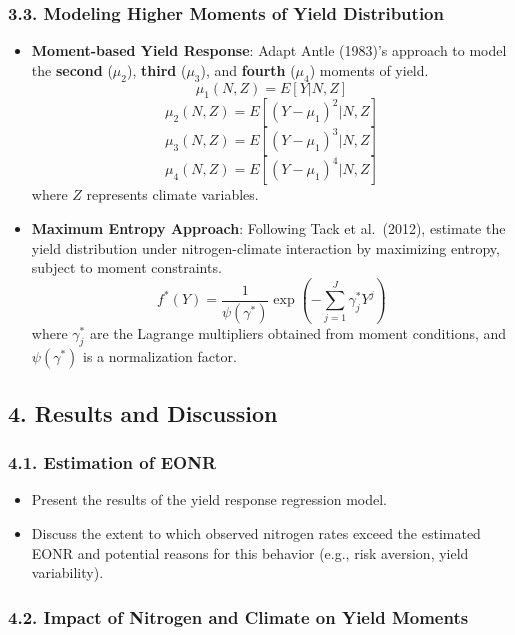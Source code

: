 \documentclass[
]{article}
\providecommand{\tightlist}{%
  \setlength{\itemsep}{0pt}\setlength{\parskip}{0pt}}\usepackage{longtable,booktabs,array}
\begin{document}
\subsubsection{3.3. Modeling Higher Moments of Yield
Distribution}\label{modeling-higher-moments-of-yield-distribution}

\begin{itemize}
\item
  \textbf{Moment-based Yield Response}: Adapt Antle (1983)'s approach to
  model the \textbf{second} (\(\mu_2\)), \textbf{third} (\(\mu_3\)), and
  \textbf{fourth} (\(\mu_4\)) moments of yield. \[
  \mu_1(N, Z) = E[Y | N, Z]
  \] \[
  \mu_2(N, Z) = E[(Y - \mu_1)^2 | N, Z]
  \] \[
  \mu_3(N, Z) = E[(Y - \mu_1)^3 | N, Z]
  \] \[
  \mu_4(N, Z) = E[(Y - \mu_1)^4 | N, Z]
  \] where \(Z\) represents climate variables.
\item
  \textbf{Maximum Entropy Approach}: Following Tack et al.~(2012),
  estimate the yield distribution under nitrogen-climate interaction by
  maximizing entropy, subject to moment constraints. \[
  f^*(Y) = \frac{1}{\psi(\gamma^*)} \exp \left( - \sum_{j=1}^J \gamma_j^* Y^j \right)
  \] where \(\gamma_j^*\) are the Lagrange multipliers obtained from
  moment conditions, and \(\psi(\gamma^*)\) is a normalization factor.
\end{itemize}

\subsection{4. Results and Discussion}\label{results-and-discussion}

\subsubsection{4.1. Estimation of EONR}\label{estimation-of-eonr}

\begin{itemize}
\tightlist
\item
  Present the results of the yield response regression model.
\item
  Discuss the extent to which observed nitrogen rates exceed the
  estimated EONR and potential reasons for this behavior (e.g., risk
  aversion, yield variability).
\end{itemize}

\subsubsection{4.2. Impact of Nitrogen and Climate on Yield
Moments}\label{impact-of-nitrogen-and-climate-on-yield-moments}
\end{document}
